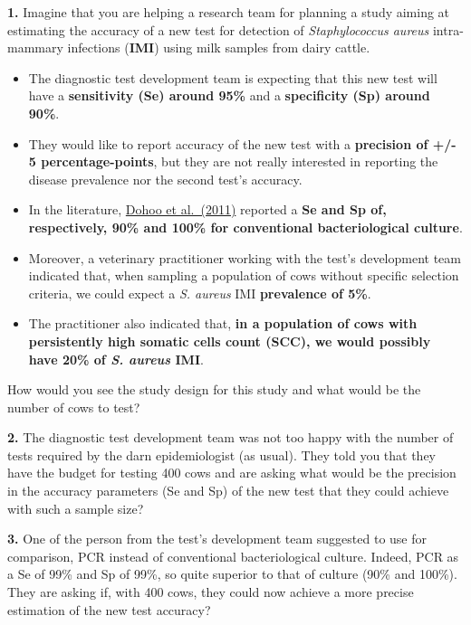 \documentclass[
]{book}
\providecommand{\tightlist}{%
  \setlength{\itemsep}{0pt}\setlength{\parskip}{0pt}}
\begin{document}
\textbf{1.} Imagine that you are helping a research team for planning a study aiming at estimating the accuracy of a new test for detection of \emph{Staphylococcus aureus} intra-mammary infections (\textbf{IMI}) using milk samples from dairy cattle.

\begin{itemize}
\tightlist
\item
  The diagnostic test development team is expecting that this new test will have a \textbf{sensitivity (Se) around 95\%} and a \textbf{specificity (Sp) around 90\%}.\\
\item
  They would like to report accuracy of the new test with a \textbf{precision of +/- 5 percentage-points}, but they are not really interested in reporting the disease prevalence nor the second test's accuracy.\\
\item
  In the literature, \href{https://www.sciencedirect.com/science/article/pii/S0022030210006922?via\%3Dihub}{Dohoo et al.~(2011)} reported a \textbf{Se and Sp of, respectively, 90\% and 100\% for conventional bacteriological culture}.\\
\item
  Moreover, a veterinary practitioner working with the test's development team indicated that, when sampling a population of cows without specific selection criteria, we could expect a \emph{S. aureus} IMI \textbf{prevalence of 5\%}.\\
\item
  The practitioner also indicated that, \textbf{in a population of cows with persistently high somatic cells count (SCC), we would possibly have 20\% of \emph{S. aureus} IMI}.
\end{itemize}

How would you see the study design for this study and what would be the number of cows to test?

\textbf{2.} The diagnostic test development team was not too happy with the number of tests required by the darn epidemiologist (as usual). They told you that they have the budget for testing 400 cows and are asking what would be the precision in the accuracy parameters (Se and Sp) of the new test that they could achieve with such a sample size?

\textbf{3.} One of the person from the test's development team suggested to use for comparison, PCR instead of conventional bacteriological culture. Indeed, PCR as a Se of 99\% and Sp of 99\%, so quite superior to that of culture (90\% and 100\%). They are asking if, with 400 cows, they could now achieve a more precise estimation of the new test accuracy?
\end{document}
